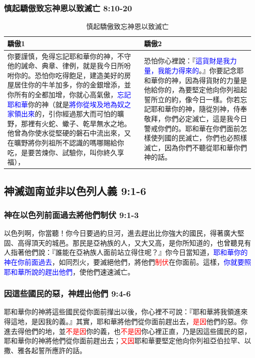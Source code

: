 \subsubsection{慎起驕傲致忘神恩以致滅亡 8:10-20}
\begin{table}[H]
\begin{center}
\begin{tabular}{ p{9.5cm}|p{7.5cm} } \toprule
驕傲1 &驕傲2 \\\hline
你要謹慎，免得忘記耶和華你的神，不守他的誡命、典章、律例，就是我今日所吩咐你的。恐怕你吃得飽足，建造美好的房屋居住你的牛羊加多，你的金銀增添，並你所有的全都加增，你就心高氣傲，\textcolor{blue}{忘記耶和華}你的神（就是\textcolor{blue}{將你從埃及地為奴之家領出來}的，引你經過那大而可怕的曠野，那裡有火蛇、蠍子、乾旱無水之地。他曾為你使水從堅硬的磐石中流出來，又在曠野將你列祖所不認識的嗎哪賜給你吃，是要苦煉你、試驗你，叫你終久享福），&恐怕你心裡說：『\textcolor{blue}{這貨財是我力量，我能力得來的}。』你要記念耶和華你的神，因為得貨財的力量是他給你的，為要堅定他向你列祖起誓所立的約，像今日一樣。你若忘記耶和華你的神，隨從別神，侍奉敬拜，你們必定滅亡，這是我今日警戒你們的。耶和華在你們面前怎樣使列國的民滅亡，你們也必照樣滅亡，因為你們不聽從耶和華你們神的話。\\ \hline
\end{tabular}
\end{center}
\caption{慎起驕傲致忘神恩以致滅亡}
\end{table}



\subsection{神滅迦南並非以色列人義 9:1-6}
\subsubsection{神在以色列前面過去將他們制伏 9:1-3}
以色列啊，你當聽！你今日要過約旦河，進去趕出比你強大的國民，得著廣大堅固、高得頂天的城邑。那民是亞衲族的人，又大又高，是你所知道的，也曾聽見有人指著他們說：『誰能在亞衲族人面前站立得住呢？』你今日當知道，\textcolor{blue}{耶和華你的神在你前面過去}，如同烈火，要滅絕他們，將他們\textcolor{red}{制伏}在你面前。這樣，\textcolor{blue}{你就要照耶和華所說的趕出他們}，使他們速速滅亡。

\subsubsection{因這些國民的惡，神趕出他們 9:4-6}
耶和華你的神將這些國民從你面前攆出以後，你心裡不可說：『耶和華將我領進來得這地，是因我的義。』其實，耶和華將他們從你面前趕出去，\textcolor{red}{是因}他們的惡。你進去得他們的地，並\textcolor{red}{不是因}你的義，也\textcolor{red}{不是因}你心裡正直，乃是因這些國民的惡，耶和華你的神將他們從你面前趕出去；\textcolor{red}{又因}耶和華要堅定他向你列祖亞伯拉罕、以撒、雅各起誓所應許的話。


